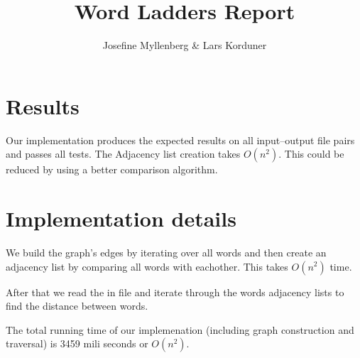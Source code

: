 \documentclass{tufte-handout}
\title{Word Ladders Report}
\author{Josefine Myllenberg \& Lars Korduner}
\begin{document}
\maketitle

  \section{Results}

  Our implementation produces the expected results on all input--output file pairs and passes all tests. The Adjacency list creation takes $O(n^2)$.  This could be reduced by using a better comparison algorithm.

  \section{Implementation details}

  We build the graph's edges by iterating over all words and then create an adjacency list by comparing all words with eachother. This takes $O(n^2)$ time.
  
  After that we read the in file and iterate through the words adjacency lists to find the distance between words.
  
  The total running time of our implemenation (including graph construction and traversal) is 3459 mili seconds or $O(n^2)$.
\end{document}
